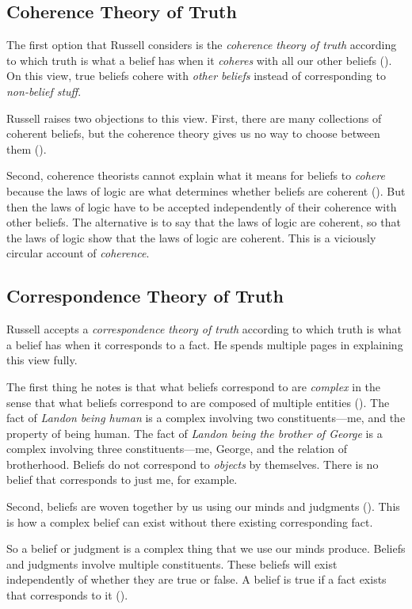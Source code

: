\documentclass[oneside,letterpaper,12pt]{book}
\begin{document}
\subsection*{Coherence Theory of Truth}
The first option that Russell considers is the \textit{coherence theory of truth} according to which truth is what a belief has when it \textit{coheres} with all our other beliefs (\pageref{coherence}). On this view, true beliefs cohere with \textit{other beliefs} instead of corresponding to \textit{non-belief stuff}.

Russell raises two objections to this view. First, there are many collections of coherent beliefs, but the coherence theory gives us no way to choose between them (\pageref{multiple}). 

Second, coherence theorists cannot explain what it means for beliefs to \textit{cohere} because the laws of logic are what determines whether beliefs are coherent (\pageref{laws}). But then the laws of logic have to be accepted independently of their coherence with other beliefs. The alternative is to say that the laws of logic are coherent, so that the laws of logic show that the laws of logic are coherent. This is a viciously circular account of \textit{coherence}. 
\subsection*{Correspondence Theory of Truth}
Russell accepts a \textit{correspondence theory of truth} according to which truth is what a belief has when it corresponds to a fact. He spends multiple pages in explaining this view fully.

The first thing he notes is that what beliefs correspond to are \textit{complex} in the sense that what beliefs correspond to are composed of multiple entities (\pageref{entities}). The fact of \textit{Landon being human} is a complex involving two constituents---me, and the property of being human. The fact of \textit{Landon being the brother of George} is a complex involving three constituents---me, George, and the relation of brotherhood. Beliefs do not correspond to \textit{objects} by themselves. There is no belief that corresponds to just me, for example.

Second, beliefs are woven together by us using our minds and judgments (\pageref{weaving}). This is how a complex belief can exist without there existing corresponding fact.

So a belief or judgment is a complex thing that we use our minds produce. Beliefs and judgments involve multiple constituents. These beliefs will exist independently of whether they are true or false. A belief is true if a fact exists that corresponds to it (\pageref{corresponds}).
\end{document}
